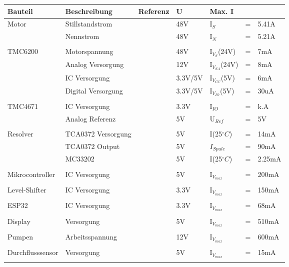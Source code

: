 \begin{tabularx}{\textwidth}{llllllX}
 \textbf{Bauteil}& \textbf{Beschreibung} & \textbf{Referenz} & \textbf{U} & \textbf{Max. I} \\
\hline
Motor & Stillstandstrom & \cite[S.4]{sigmatec_servomotoren_2018}& 48V & I$_S$ & = & 5.41A 
\\
 & Nennstrom & \cite[S.4]{sigmatec_servomotoren_2018} & 48V & I$_N$ & = & 5.21A\\
\\
TMC6200 & Motorspannung & \cite[S.36]{trinamic_tmc6200_datasheet_2013}& 48V & I$_{V_S}$(24V) & = & 7mA \\
 & Analog Versorgung & \cite[S.36]{trinamic_tmc6200_datasheet_2013} & 12V & I$_{V_{SA}}$(24V) & = & 8mA\\
 & IC Versorgung & \cite[S.36]{trinamic_tmc6200_datasheet_2013} & 3.3V/5V & I$_{V_{CC}}$(5V) & = & 6mA\\
 & Digital Versorgung & \cite[S.36]{trinamic_tmc6200_datasheet_2013} & 3.3V/5V& I$_{V_{IO}}$(5V) & = & 30uA\\
 \\
TMC4671 & IC Versorgung & \cite[S.140]{trinamic_datasheet_2018} & 3.3V & I$_{IO}$ & = & k.A \\
 & Analog Referenz & \cite[S.141]{trinamic_datasheet_2018} & 5V & U$_{Ref}$ & = & 5V \\
\\
Resolver & TCA0372 Versorgung & \cite[S.3]{on_semiconductor_operational_2020}& 5V & I(25$^\circ C$) & = & 14mA \\
 & TCA0372 Output & & 5V & $I_{Spule}$ & = & 90mA\\
 & MC33202 & \cite[S.3]{on_semiconductor_low_2018}& 5V & I(25$^\circ C$) & = & 2.25mA \\
\\
Mikrocontroller & IC Versorgung & \cite[S.355]{atmel_8-bit_2014}& 5V & I$_{V_{max}}$ & = & 200mA \\
\\
Level-Shifter & IC Versorgung & \cite[S.3]{nxp_semiconductors_74hc4050_2016} & 3.3V & I$_{V_{max}}$ & = & 150mA\\
\\
ESP32 & IC Versorgung & \cite[S.21]{espressif_systems_esp32_2020}& 3.3V & I$_{V_{max}}$ & = & 68mA\\
\\
Display & Versorgung  & \cite{patrick_nx8048t070_nodate}& 5V & I$_{V_{max}}$ & = & 510mA\\
\\
Pumpen & Arbeitsspannung  & \cite{aiyimaindustrial_store_us_nodate}& 12V & I$_{V_{max}}$ &  = & 600mA\\
\\
Durchflusssensor & Versorgung  & \cite{five_+_tools_store_us_nodate}& 5V & I$_{V_{max}}$ &  = & 15mA\\
\\
\end{tabularx}

